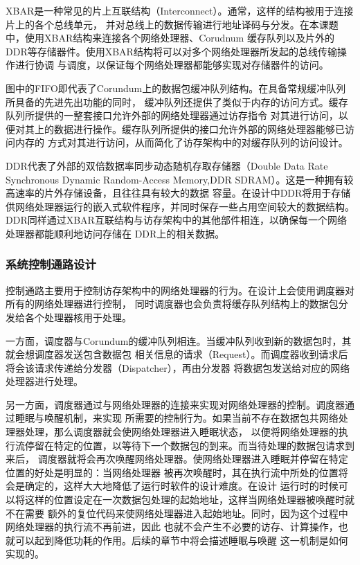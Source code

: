 XBAR是一种常见的片上互联结构（Interconnect）。通常，这样的结构被用于连接片上的各个总线单元，
并对总线上的数据传输进行地址译码与分发。在本课题中，使用XBAR结构来连接各个网络处理器、Corudnum
缓存队列以及片外的DDR等存储器件。使用XBAR结构将可以对多个网络处理器所发起的总线传输操作进行协调
与调度，以保证每个网络处理器都能够实现对存储器件的访问。

图中的FIFO即代表了Corundum上的数据包缓冲队列结构。在具备常规缓冲队列所具备的先进先出功能的同时，
缓冲队列还提供了类似于内存的访问方式。缓存队列所提供的一整套接口允许外部的网络处理器通过访存指令
对其进行访问，以便对其上的数据进行操作。缓存队列所提供的接口允许外部的网络处理器能够已访问内存的
方式对其进行访问，从而简化了访存架构中的对缓存队列的访问设计。

DDR代表了外部的双倍数据率同步动态随机存取存储器（Double Data Rate Synchronous Dynamic
Random-Access Memory,DDR SDRAM）。这是一种拥有较高速率的片外存储设备，且往往具有较大的数据
容量。在设计中DDR将用于存储供网络处理器运行的嵌入式软件程序，并同时保存一些占用空间较大的数据结构。
DDR同样通过XBAR互联结构与访存架构中的其他部件相连，以确保每一个网络处理器都能顺利地访问存储在
DDR上的相关数据。

\subsubsection{系统控制通路设计}

控制通路主要用于控制访存架构中的网络处理器的行为。在设计上会使用调度器对所有的网络处理器进行控制，
同时调度器也会负责将缓存队列结构上的数据包分发给各个处理器核用于处理。


一方面，调度器与Corundum的缓冲队列相连。当缓冲队列收到新的数据包时，其就会想调度器发送包含数据包
相关信息的请求（Request）。而调度器收到请求后将会该请求传递给分发器（Dispatcher），再由分发器
将数据包发送给对应的网络处理器进行处理。

另一方面，调度器通过与网络处理器的连接来实现对网络处理器的控制。调度器通过睡眠与唤醒机制，来实现
所需要的控制行为。如果当前不存在数据包共网络处理器处理，那么调度器就会使网络处理器进入睡眠状态，
以便将网络处理器的执行流停留在特定的位置，以等待下一个数据包的到来。而当待处理的数据包请求到来后，
调度器就将会再次唤醒网络处理器。使网络处理器进入睡眠并停留在特定位置的好处是明显的：当网络处理器
被再次唤醒时，其在执行流中所处的位置将会是确定的，这样大大地降低了运行时软件的设计难度。在设计
运行时的时候可以将这样的位置设定在一次数据包处理的起始地址，这样当网络处理器被唤醒时就不在需要
额外的复位代码来使网络处理器进入起始地址。同时，因为这个过程中网络处理器的执行流不再前进，因此
也就不会产生不必要的访存、计算操作，也就可以起到降低功耗的作用。后续的章节中将会描述睡眠与唤醒
这一机制是如何实现的。

